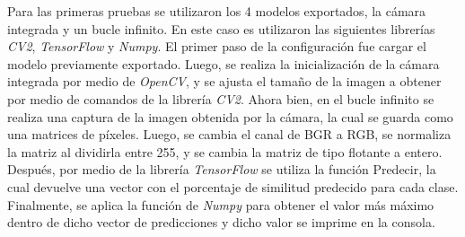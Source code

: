 Para las primeras pruebas se utilizaron los 4 modelos exportados, la cámara integrada y un bucle infinito. En este caso es utilizaron las siguientes librerías \textit{CV2}, \textit{TensorFlow} y \textit{Numpy}. El primer paso de la configuración fue cargar el modelo previamente exportado. Luego, se realiza la inicialización de la cámara integrada por medio de \textit{OpenCV}, y se ajusta el tamaño de la imagen a obtener por medio de comandos de la librería \textit{CV2}. 
Ahora bien, en el bucle infinito se realiza una captura de la imagen obtenida por la cámara, la cual se guarda como una matrices de píxeles. Luego, se cambia el canal de BGR a RGB, se normaliza la matriz al dividirla entre 255, y se cambia la matriz de tipo flotante a entero. Después, por medio de la librería \textit{TensorFlow} se utiliza la función Predecir, la cual devuelve una vector con el porcentaje de similitud predecido para cada clase. Finalmente, se aplica la función de \textit{Numpy} para obtener el valor más máximo dentro de dicho vector de predicciones y dicho valor se imprime en la consola.

